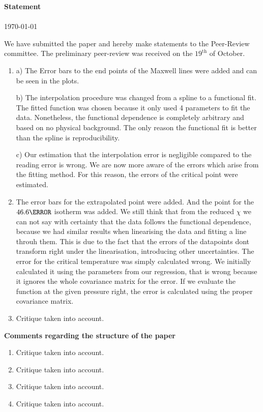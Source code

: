 \documentclass[a4paper,10pt]{article}
\begin{document}
    \begin{center}
        \Large\textbf{Statement}\\
        \large{}\\
        \normal\today
    \end{center}

    We have submitted the paper and hereby make statements to the Peer-Review committee.
    The preliminary peer-review was received on the $19^{\text{th}}$ of October.

    \begin{enumerate}
        \item 
        a) The Error bars to the end points of the Maxwell lines were added and can be seen in the plots.
        
        b) The interpolation procedure was changed from a spline to a functional fit.
        The fitted function was chosen because it only used 4 parameters to fit the data.
        Nonetheless, the functional dependence is completely arbitrary and based on no physical background.
        The only reason the functional fit is better than the spline is reproducibility.
        
        c) Our estimation that the interpolation error is negligible compared to the reading error is wrong.
        We are now more aware of the errors which arise from the fitting method.
        For this reason, the errors of the critical point were estimated.

        \item The error bars for the extrapolated point were added. And the point for the $46.6\degree$ isotherm was added.
        We still think that from the reduced $\chi$ we can not say with certainty that the data follows the functional dependence, because we had similar results when linearising the data and fitting a line throuh them.
        This is due to the fact that the errors of the datapoints dont transform right under the linearisation, introducing other uncertainties.
        The error for the critical temperature was simply calculated wrong.
        We initially calculated it using the parameters from our regression, that is wrong because it ignores the whole covariance matrix for the error.
        If we evaluate the function at the given pressure right, the error is calculated using the proper covariance matrix.
        
        \item Critique taken into account.
    \end{enumerate}
        \textbf{Comments regarding the structure of the paper}
    \begin{enumerate}
        \item Critique taken into account.
        \item Critique taken into account.
        \item Critique taken into account.
        \item Critique taken into account.
    \end{enumerate}
    


    
\end{document}
